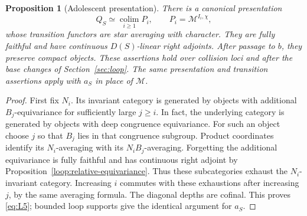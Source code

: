 \documentclass[11pt]{article}
\numberwithin{equation}{section}
\newtheorem{proposition}[theorem]{Proposition}
\theoremstyle{definition}
\theoremstyle{remark}
\begin{document}
\begin{proposition}[Adolescent presentation]\label{walg:adolescent}
There is a canonical presentation
\begin{equation}\label{eq:L5}
 Q_S\simeq\underset{i\geq1}{\operatorname{colim}}P_i,
 \qquad P_i=\mathcal M^{I_i,\chi},
\end{equation}
whose transition functors are star averaging with character.  They are
fully faithful and have continuous \(D(S)\)-linear right adjoints.
After passage to \(b\), they preserve compact objects.  These
assertions hold over collision loci and after the base changes of Section~\ref{sec:loop}.
The same presentation and transition assertions apply with
\(a_S\) in place of \(\mathcal M\).
\end{proposition}

\begin{proof}
First fix \(N_i\).  Its invariant category is generated by objects with
additional \(B_j\)-equivariance for sufficiently large \(j\geq i\).
In fact, the underlying category is generated by objects with deep
congruence equivariance.  For such an object choose \(j\) so that
\(B_j\) lies in that congruence subgroup.  Product coordinates identify
its \(N_i\)-averaging with its \(N_iB_j\)-averaging.  Forgetting the
additional equivariance is fully faithful and has continuous right
adjoint by Proposition~\ref{loop:relative-equivariance}.  Thus these
subcategories exhaust the \(N_i\)-invariant category.  Increasing
\(i\) commutes with these exhaustions after increasing \(j\), by the
same averaging formula.  The diagonal depths are cofinal.  This proves
\eqref{eq:L5}; bounded loop supports give the identical argument for
\(a_S\).


\end{proof}
\end{document}
